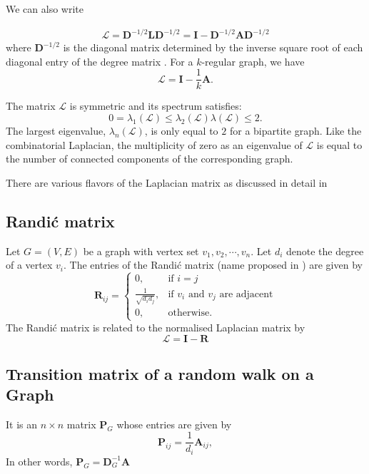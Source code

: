 \documentclass[10pt,a4paper]{article}
\begin{document}
We can also write 

\begin{eqnarray*}
	\mathbf{\mathcal{L}} = \mathbf{D}^{-1/2} \mathbf{L} \mathbf{D}^{-1/2} = \mathbf{I} -\mathbf{D}^{-1/2} \mathbf{A} \mathbf{D}^{-1/2}
\end{eqnarray*}
where $\mathbf{D}^{-1/2}$ is the diagonal matrix determined by the inverse square root of each diagonal entry of the degree matrix \citep{estrada2011structure}. For a $k$-regular graph, we have
\begin{equation}
\mathcal{L} = \mathbf{I}-\frac{1}{k} \mathbf{A}.
\end{equation}

The matrix $\mathcal{L}$ is symmetric and its spectrum satisfies:
\begin{equation*}
0  = \lambda_1(\mathcal{L}) \leq  \lambda_2(\mathcal{L}) \lambda(\mathcal{L}) \leq 2.
\end{equation*}
The largest eigenvalue, $\lambda_n(\mathcal{L})$, is only equal to $2$ for a bipartite graph. Like the combinatorial Laplacian, the multiplicity of zero as an eigenvalue of $\mathcal{L}$ is equal to the number of connected components of the corresponding graph.

There are various flavors of the Laplacian matrix as discussed in detail in \citep{tsiatas2012diffusion}

\subsection{Randi\'{c} matrix}
Let $G=(V,E)$ be a graph with vertex set ${v_1,v_2, \cdots, v_n}$. Let $d_i$ denote the degree of a vertex $v_i$. The entries of the Randi\'{c} matrix (name proposed in \citep{bozkurt2010randic}) are given by
\begin{equation*}
\mathbf{R}_{ij} = \begin{cases} 0, &\mbox{if } i = j \\
\frac{1}{\sqrt{d_i d_j}}, &\mbox{if } v_i \text{ and } v_j \text{ are adjacent} \\ 
0, & \text{otherwise}.
\end{cases}
\end{equation*}
The Randi\'{c} matrix is related to the normalised Laplacian matrix by
\begin{equation}
\mathcal{L} = \mathbf{I} -\mathbf{R}
\end{equation}

\subsection{Transition matrix of a random walk on a Graph}
It is an $n \times n$ matrix $\mathbf{P}_G$ whose entries are given by
\begin{equation}
\mathbf{P}_{ij} = \frac{1}{d_i} \mathbf{A}_{ij},
\end{equation}
In other words, $\mathbf{P}_G = \mathbf{D}_{G} ^ {-1} \mathbf{A}$
\end{document}
